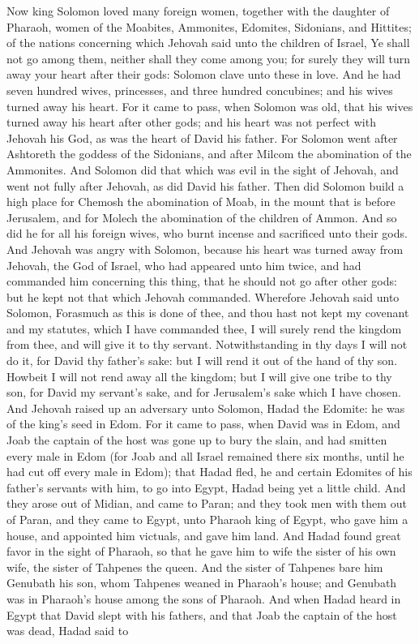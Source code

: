 Now king Solomon loved many foreign women, together with the daughter of Pharaoh, women of the Moabites, Ammonites, Edomites, Sidonians, and Hittites; of the nations concerning which Jehovah said unto the children of Israel, Ye shall not go among them, neither shall they come among you; for surely they will turn away your heart after their gods: Solomon clave unto these in love. And he had seven hundred wives, princesses, and three hundred concubines; and his wives turned away his heart. For it came to pass, when Solomon was old, that his wives turned away his heart after other gods; and his heart was not perfect with Jehovah his God, as was the heart of David his father. For Solomon went after Ashtoreth the goddess of the Sidonians, and after Milcom the abomination of the Ammonites. And Solomon did that which was evil in the sight of Jehovah, and went not fully after Jehovah, as did David his father. Then did Solomon build a high place for Chemosh the abomination of Moab, in the mount that is before Jerusalem, and for Molech the abomination of the children of Ammon. And so did he for all his foreign wives, who burnt incense and sacrificed unto their gods.  And Jehovah was angry with Solomon, because his heart was turned away from Jehovah, the God of Israel, who had appeared unto him twice, and had commanded him concerning this thing, that he should not go after other gods: but he kept not that which Jehovah commanded. Wherefore Jehovah said unto Solomon, Forasmuch as this is done of thee, and thou hast not kept my covenant and my statutes, which I have commanded thee, I will surely rend the kingdom from thee, and will give it to thy servant. Notwithstanding in thy days I will not do it, for David thy father’s sake: but I will rend it out of the hand of thy son. Howbeit I will not rend away all the kingdom; but I will give one tribe to thy son, for David my servant’s sake, and for Jerusalem’s sake which I have chosen.  And Jehovah raised up an adversary unto Solomon, Hadad the Edomite: he was of the king’s seed in Edom. For it came to pass, when David was in Edom, and Joab the captain of the host was gone up to bury the slain, and had smitten every male in Edom (for Joab and all Israel remained there six months, until he had cut off every male in Edom); that Hadad fled, he and certain Edomites of his father’s servants with him, to go into Egypt, Hadad being yet a little child. And they arose out of Midian, and came to Paran; and they took men with them out of Paran, and they came to Egypt, unto Pharaoh king of Egypt, who gave him a house, and appointed him victuals, and gave him land. And Hadad found great favor in the sight of Pharaoh, so that he gave him to wife the sister of his own wife, the sister of Tahpenes the queen. And the sister of Tahpenes bare him Genubath his son, whom Tahpenes weaned in Pharaoh’s house; and Genubath was in Pharaoh’s house among the sons of Pharaoh. And when Hadad heard in Egypt that David slept with his fathers, and that Joab the captain of the host was dead, Hadad said to 